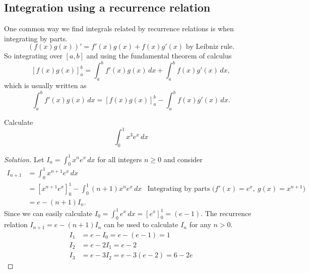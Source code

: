 \documentclass[10pt, a4paper]{article}
\begin{document}
\subsection{Integration using a recurrence relation}
One common way we find integrals related by recurrence relations is when integrating by parts.
\[
(f(x)g(x))' = f'(x)g(x) + f(x)g'(x)\text{ by Leibniz rule}.
\]
So integrating over $[a, b]$ and using the fundamental theorem of calculus
\[
\left[f(x)g(x)\right]_a^b = \int_a^bf'(x)g(x)\,dx + \int_a^bf(x)g'(x)\,dx,
\]
which is usually written as
\[
\int_a^bf'(x)g(x)\,dx = \left[f(x)g(x)\right]_a^b - \int_a^bf(x)g'(x)\,dx.
\]
\begin{example}
    Calculate
    \[
    \int_0^1x ^ 3 e ^ x\,dx
    \]
    \begin{proof}[Solution]\renewcommand{\qedsymbol}{}
        Let $I_n = \int_0^1x ^ n e ^ x\,dx$ for all integers $n \geq 0$ and consider
        \begin{align*}
        I_{n + 1} &= \int_0^1 x ^ {n + 1}e ^ x\,dx \\
        &= \left[x ^ {n + 1} e ^ x\right]_0^1 - \int_0^1(n + 1)x ^ n e ^ x\,dx &\text{Integrating by parts ($f'(x) = e ^ x,\ g(x) = x ^ {n + 1}$)} \\
        &= e - (n + 1)I_n.
        \end{align*}
        Since we can easily calculate $I_0 = \int_0^1e ^ x\,dx = \left[e ^ x\right]_0^1 = (e - 1)$.
        The recurrence relation $I_{n + 1} = e - (n + 1)I_n$ can be used to calculate $I_n$ for any $n > 0$.
        \begin{align*}
        I_1 &= e - I_0 = e - (e - 1) = 1 \\
        I_2 &= e - 2I_1 = e - 2 \\
        I_3 &= e - 3I_2 = e - 3(e - 2) = 6 - 2e
        \end{align*}
        
    \end{proof}
\end{example}
\end{document}
